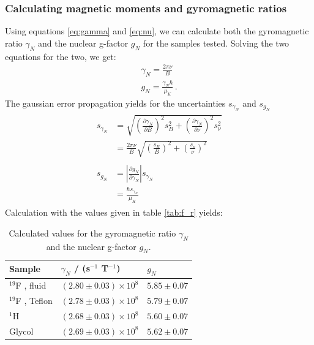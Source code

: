 \subsubsection{Calculating magnetic moments and gyromagnetic ratios}
Using equations \eqref{eq:gamma} and \eqref{eq:nu}, we can calculate both 
the gyromagnetic ratio $\gamma_N$ and the nuclear g-factor $g_N$ for the samples 
tested. Solving the two equations for the two, we get:
\begin{align}
    \gamma_N = \frac{2 \pi \nu}{B} \\
    g_N = \frac{\gamma_N \hbar}{\mu_K} \,.
\end{align}
The gaussian error propagation yields for the uncertainties $s_{\gamma_N}$ and $s_{g_N}$ 
\begin{align}
    \begin{split}
        s_{\gamma_N} &= \sqrt{
            \left(\frac{\partial \gamma_N}{\partial B}\right)^2 s_B^2 + 
            \left(\frac{\partial \gamma_N}{\partial \nu}\right)^2 s_\nu^2}  \\
        &= \frac{2 \pi \nu}{B}\sqrt{
            \left(\frac{s_B}{B}\right)^2 +\left(\frac{s_\nu}{\nu}\right)^2 }
    \end{split} \\
    \begin{split}
    s_{g_N} &= 
        \left|\frac{\partial g_N}{\partial \gamma_N}\right| s_{\gamma_N} \\
        &= \frac{\hbar s_{\gamma_N}}{\mu_K}
    \end{split}
\end{align}
Calculation with the values given in table \ref{tab:f_r} yields:
\renewcommand{\arraystretch}{1.5}
\begin{table}[H]
\centering
\begin{tabular}{|p{6.18cm}|p{3.82cm}|p{3.82cm}|}
        \hline
        \rowcolor{LightCyan}
        Sample & $\gamma_N$ / (s$^{-1}$ T$^{-1}$) & $g_N$ \\ \hline
        $^{19}$F , fluid     & $\left(2.80 \pm 0.03\right) \times 10^{8}$ & $5.85 \pm 0.07$ \\
        $^{19}$F , Teflon    & $\left(2.78 \pm 0.03\right) \times 10^{8}$ & $5.79 \pm 0.07$ \\
        $^1$H               & $\left(2.68 \pm 0.03\right) \times 10^{8}$ & $5.60 \pm 0.07$ \\
        Glycol              & $\left(2.69 \pm 0.03\right) \times 10^{8}$ & $5.62 \pm 0.07$ \\
        \hline
    \end{tabular}
    \caption{
        Calculated values for the gyromagnetic ratio $\gamma_N$ and the nuclear g-factor $g_N$. 
        }
    \label{tab:g_N}
\end{table} 
